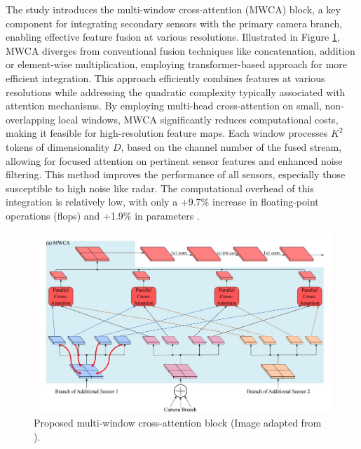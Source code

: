 \documentclass[report.tex]{subfiles}
\begin{document}



    The study introduces the multi-window cross-attention (MWCA) block, a key component for integrating secondary sensors with the primary camera branch, enabling effective feature fusion at various resolutions. Illustrated in Figure \ref{fig:hrfuser_mwca_block}, MWCA diverges from conventional fusion techniques like concatenation, addition or element-wise multiplication, employing transformer-based approach for more efficient integration. This approach efficiently combines features at various resolutions while addressing the quadratic complexity typically associated with attention mechanisms. By employing multi-head cross-attention on small, non-overlapping local windows, MWCA significantly reduces computational costs, making it feasible for high-resolution feature maps. Each window processes \( K^2 \) tokens of dimensionality ${D}$, based on the channel number of the fused stream, allowing for focused attention on pertinent sensor features and enhanced noise filtering. This method improves the performance of all sensors, especially those susceptible to high noise like radar. The computational overhead of this integration is relatively low, with only a +9.7\% increase in floating-point operations (flops) and +1.9\% in parameters \cite{broedermann2022hrfuser}.

    \begin{figure}[h]
        \centering
        \includegraphics[width=1.0\textwidth]{images/methods/hrfuser/mwca_block_annotated.png}
        \caption{Proposed multi-window cross-attention block (Image adapted from \cite{broedermann2022hrfuser}).}
        \label{fig:hrfuser_mwca_block}
    \end{figure}
\end{document}
